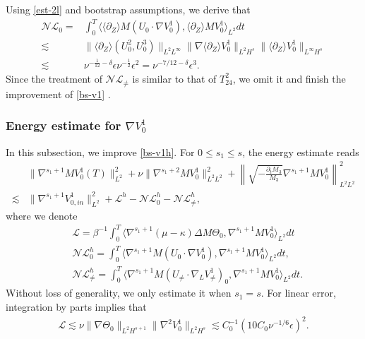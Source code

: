 \documentclass[12pt]{article}
\newcommand{\wtb}{\langle\partial_Z\rangle }
\numberwithin{equation}{section}
\begin{document}
	Using \eqref{est-2l} and bootstrap assumptions, we derive that
	\begin{align*}
		\mathcal{NL}_0=&\int_{0}^{T}\langle \wtb  M (U_0 \cdot \nabla  V^1_0), \wtb  M V^1_0\rangle_{L^2} dt \\ \lesssim&\|\wtb (U^2_0, U^3_0)\|_{L^2L^\infty}\| \nabla \wtb V^1_0\|_{L^2H^s}\|\wtb V^1_0\|_{L^{\infty}H^s}\\
		\lesssim&\nu^{-\frac{1}{12} -\delta}\epsilon\nu^{-\frac{1}{2}}\epsilon^2=\nu^{-7/12 -\delta}\epsilon^3.
	\end{align*}
	Since the treatment of $\mathcal{NL}_{\neq}$ is similar to that of  $T^2_{24}$, we omit it and finish the improvement of \eqref{bs-v1} .
    \color{black}
	
	
    \subsubsection{ Energy estimate for $\nabla V_0^1$ }   
    In this subsection, we improve \eqref{bs-v1h}. For $0\leq s_1\leq s$, the energy estimate reads
    \begin{align*}
    	&\| \nabla^{s_1+1} M V^1_0(T)\|^2_{ L^2}+ \nu\| \nabla^{s_1+2}  M V^1_0\|^2_{L^2L^2}+\left\|\sqrt{-\frac{\partial_tM_3}{M_3}}\nabla^{s_1+1} M V^1_0\right\|^2_{L^2L^2}\\
    	\lesssim&\| \nabla^{s_1+1} V^1_{0,in}\|^2_{ L^2 } +\mathcal{L}^h -\mathcal{NL}^h_0-\mathcal{NL}^h_{\neq}, 
    \end{align*}
    where we denote
    \begin{align*}
    &\mathcal{L}=\beta^{-1}\int_{0}^{T}\langle \nabla^{s_1+1}(\mu-\kappa)\Delta M\Theta_0, \nabla^{s_1+1} M V^1_0\rangle_{L^2} dt\\
        &\mathcal{NL}^{h}_0=\int_{0}^{T}\langle  \nabla^{s_1+1} M(U_{0}\cdot\nabla V^1_{0}), \nabla^{s_1+1} M V^1_0\rangle_{L^2} dt,\\
        &\mathcal{NL}^{h}_{\neq}=\int_{0}^{T}\langle \nabla^{s_1+1} M (U_{\neq}\cdot\nabla_L V^1_{\neq})_0,  \nabla^{s_1+1} M V^1_0\rangle_{L^2} dt.
    \end{align*}
    Without loss of generality, we only estimate it when $s_1=s$. 
    For linear error, integration by parts implies that 
    \begin{align*}
        \mathcal{L}\lesssim \nu\|\nabla\Theta_0\|_{L^2H^{s+1}}\|\nabla^2 V^1_0\|_{L^2H^s}\lesssim C^{-1}_0(10C_0\nu^{-1/6}\epsilon)^2.
    \end{align*}
\end{document}
